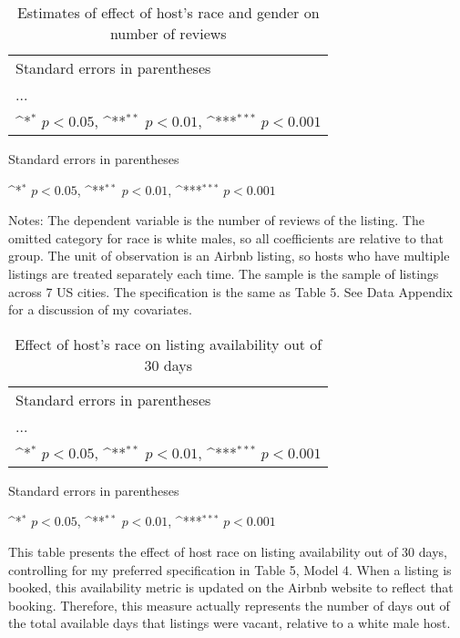 \documentclass[11pt, oneside]{article}
\begin{document}
\begin{table}[htbp]\centering
	\def\sym#1{\ifmmode^{#1}\else\(^{#1}\)\fi}
	\caption{Estimates of effect of host’s race and gender on number of reviews}
	\begin{tabular}{l*{4}{c}}
		\hline\hline
		
		\hline\hline
		\multicolumn{5}{l}{\footnotesize Standard errors in parentheses}\\
		\multicolumn{5}{l}{\footnotesize ...}\\
		\multicolumn{5}{l}{\footnotesize \sym{*} \(p<0.05\), \sym{**} \(p<0.01\), \sym{***} \(p<0.001\)}\\
	\end{tabular}
	\begin{tablenotes}
		\item \footnotesize Standard errors in parentheses
		\item \footnotesize \sym{*} \(p<0.05\), \sym{**} \(p<0.01\), \sym{***} \(p<0.001\)
		\item Notes: The dependent variable is the number of reviews of the listing. The omitted category for race is white males, so all coefficients are relative to that group. The unit of observation is an Airbnb listing, so hosts who have multiple listings are treated separately each time. The sample is the sample of listings across 7 US cities. The specification is the same as Table 5. See Data Appendix for a discussion of my covariates.	
	\end{tablenotes}
\end{table}


\begin{table}[htbp]\centering
	\def\sym#1{\ifmmode^{#1}\else\(^{#1}\)\fi}
	\caption{Effect of host’s race on listing availability out of 30 days}
	\begin{tabular}{l*{1}{c}}
		\hline\hline
		
		\hline\hline
		\multicolumn{2}{l}{\footnotesize Standard errors in parentheses}\\
		\multicolumn{2}{l}{\footnotesize ...}\\
		\multicolumn{2}{l}{\footnotesize \sym{*} \(p<0.05\), \sym{**} \(p<0.01\), \sym{***} \(p<0.001\)}\\
	\end{tabular}
	
	\begin{tablenotes}
		\item \footnotesize Standard errors in parentheses
		\item \footnotesize \sym{*} \(p<0.05\), \sym{**} \(p<0.01\), \sym{***} \(p<0.001\)
		\item This table presents the effect of host race on listing availability out of 30 days, controlling for my preferred specification in Table 5, Model 4. When a listing is booked, this availability metric is updated on the Airbnb website to reflect that booking. Therefore, this measure actually represents the number of days out of the total available days that listings were vacant, relative to a white male host.
	\end{tablenotes}
\end{table}
\end{document}
